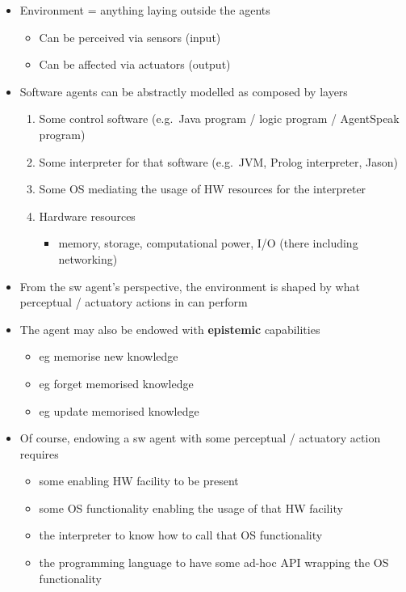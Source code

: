 \begin{itemize}
\item
  Environment = anything laying outside the agents

  \begin{itemize}
  \tightlist
  \item
    Can be perceived via sensors (input)
  \item
    Can be affected via actuators (output)
  \end{itemize}
\item
  Software agents can be abstractly modelled as composed by layers

  \begin{enumerate}
  \def\labelenumi{\arabic{enumi}.}
  \tightlist
  \item
    Some control software (e.g.~Java program / logic program /
    AgentSpeak program)
  \item
    Some interpreter for that software (e.g.~JVM, Prolog interpreter,
    Jason)
  \item
    Some OS mediating the usage of HW resources for the interpreter
  \item
    Hardware resources

    \begin{itemize}
    \tightlist
    \item
      memory, storage, computational power, I/O (there including
      networking)
    \end{itemize}
  \end{enumerate}
\item
  From the sw agent's perspective, the environment is shaped by what
  perceptual / actuatory actions in can perform
\item
  The agent may also be endowed with \textbf{epistemic} capabilities

  \begin{itemize}
  \tightlist
  \item
    eg memorise new knowledge
  \item
    eg forget memorised knowledge
  \item
    eg update memorised knowledge
  \end{itemize}
\item
  Of course, endowing a sw agent with some perceptual / actuatory action
  requires

  \begin{itemize}
  \tightlist
  \item
    some enabling HW facility to be present
  \item
    some OS functionality enabling the usage of that HW facility
  \item
    the interpreter to know how to call that OS functionality
  \item
    the programming language to have some ad-hoc API wrapping the OS
    functionality
  \end{itemize}
\end{itemize}

